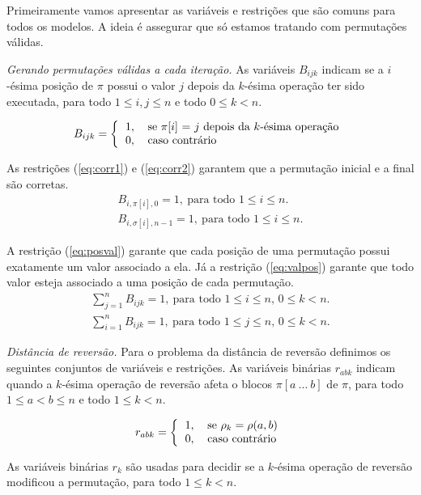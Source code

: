 Primeiramente vamos apresentar as variáveis e restrições que são
comuns para todos os modelos. A ideia é assegurar que só estamos
tratando com permutações válidas.

\textit{Gerando permutações válidas a cada iteração.} 
As variáveis $B_{ijk}$ indicam se a $i$-ésima posição de $\pi$ possui
o valor $j$ depois da $k$-ésima operação ter sido executada, para todo
$1 \le i, j \le n$ e todo $ 0 \le k < n$.

\[ 
B_{ijk} = \left \{ 
\begin{tabular}{ll} 
  1, & se $\pi[i]$ = $j$ depois da $k$-ésima operação \\ 
  0, & caso contrário
\end{tabular} 
\right .
\]

As restrições (\ref{eq:corr1}) e (\ref{eq:corr2}) garantem que a
permutação inicial e a final são corretas. 
\begin{align} 
  B_{i,\pi[i],0} = 1,~\text{para todo $1 \le i \le n$}. \label{eq:corr1} \\
  B_{i,\sigma[i],n-1} = 1,~\text{para todo $1 \le i \le n$}. \label{eq:corr2}
\end{align}

A restrição (\ref{eq:posval}) garante que cada posição de uma
permutação possui exatamente um valor associado a ela. Já a restrição
(\ref{eq:valpos}) garante que todo valor esteja associado a uma
posição de cada permutação.
\begin{align}
  \sum_{j=1}^{n} B_{ijk} = 1,~\text{para todo $1 \le i \le n$, 
  $0 \le k < n$}. \label{eq:posval} \\
  \sum_{i=1}^{n} B_{ijk} = 1,~\text{para todo $1 \le j \le n$, $0 \le
   k < n$}. \label{eq:valpos}
\end{align}

\textit{Distância de reversão.}
Para o problema da distância de reversão definimos os seguintes
conjuntos de variáveis e restrições. As variáveis binárias $r_{abk}$
indicam quando a $k$-ésima operação de reversão afeta o blocos
$\pi[a~\ldots~b]$ de $\pi$, para todo $1 \le a < b \le n$ e todo
$1 \le k < n$.

\[
r_{abk} = \left \{ 
\begin{tabular}{ll} 
  1, & se $\rho_{k} = \rho(a,b)$ \\
  0, & caso contrário
\end{tabular} 
\right .
\]

As variáveis binárias $r_{k}$ são usadas para decidir se a $k$-ésima
operação de reversão modificou a permutação, para todo $ 1 \le k < n$.


